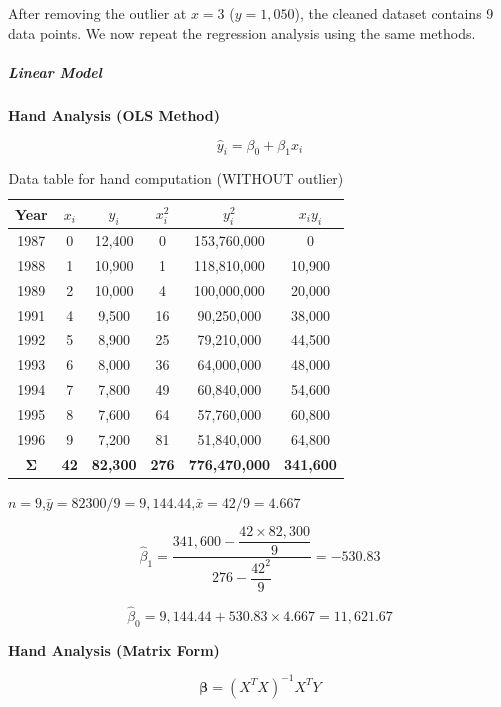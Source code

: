 \documentclass[12pt,a4paper]{article}
\begin{document}
After removing the outlier at $x=3$ ($y=1{,}050$), the cleaned dataset contains 9
data points. We now repeat the regression analysis using the same methods.

\subparagraph{Linear Model}

\textbf{Hand Analysis (OLS Method)}

\[
\hat{y}_i = \beta_0 + \beta_1 x_i
\]

\begin{table}[H]
\centering
\caption{Data table for hand computation (WITHOUT outlier)}
\begin{tabular}{cccccc}
\toprule
\textbf{Year} & $x_i$ & $y_i$ & $x_i^2$ & $y_i^2$ & $x_i y_i$ \\
\midrule
1987 & 0  & 12,400 & 0   & 153,760,000 & 0       \\
1988 & 1  & 10,900 & 1   & 118,810,000 & 10,900  \\
1989 & 2  & 10,000 & 4   & 100,000,000 & 20,000  \\
1991 & 4  & 9,500  & 16  & 90,250,000  & 38,000  \\
1992 & 5  & 8,900  & 25  & 79,210,000  & 44,500  \\
1993 & 6  & 8,000  & 36  & 64,000,000  & 48,000  \\
1994 & 7  & 7,800  & 49  & 60,840,000  & 54,600  \\
1995 & 8  & 7,600  & 64  & 57,760,000  & 60,800  \\
1996 & 9  & 7,200  & 81  & 51,840,000  & 64,800  \\
\midrule
$\boldsymbol{\Sigma}$ & \textbf{42} & \textbf{82,300} & \textbf{276} & \textbf{776,470,000} & \textbf{341,600} \\
\bottomrule
\end{tabular}
\end{table}

$n = 9$,\quad $\bar{y} = 82300/9 = 9{,}144.44$,\quad $\bar{x} = 42/9 = 4.667$

\[
\hat{\beta}_1 = \frac{341{,}600 - \dfrac{42 \times 82{,}300}{9}}{276 - \dfrac{42^2}{9}} = -530.83
\]

\[
\hat{\beta}_0 = 9{,}144.44 + 530.83 \times 4.667 = 11{,}621.67
\]

\textbf{Hand Analysis (Matrix Form)}

\[
\bm{\beta} = (X^T X)^{-1} X^T Y
\]
\end{document}
